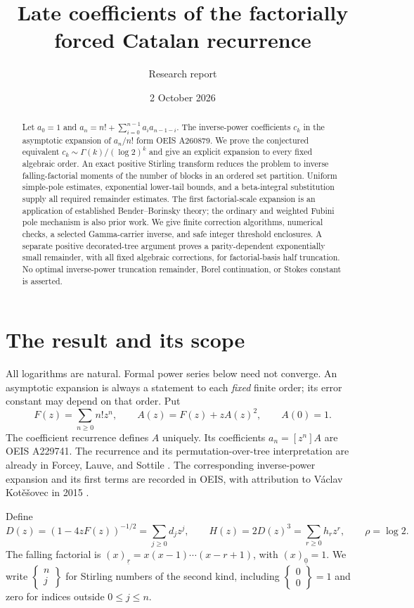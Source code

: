 \documentclass[11pt,letterpaper]{article}
\title{Late coefficients of the factorially forced Catalan recurrence}
\author{Research report}
\date{2 October 2026}
\numberwithin{equation}{section}
\theoremstyle{remark}\newtheorem{remark}[theorem]{Remark}
\newcommand{\fall}[2]{(#1)_{\underline{#2}}}
\newcommand{\stir}[2]{\left\{\begin{smallmatrix}#1\\#2\end{smallmatrix}\right\}}
\begin{document}
\maketitle
\begin{abstract}
Let $a_0=1$ and $a_n=n!+\sum_{i=0}^{n-1}a_i a_{n-1-i}$. The inverse-power coefficients $c_k$ in the asymptotic expansion of $a_n/n!$ form OEIS A260879. We prove the conjectured equivalent $c_k\sim\Gamma(k)/(\log 2)^k$ and give an explicit expansion to every fixed algebraic order. An exact positive Stirling transform reduces the problem to inverse falling-factorial moments of the number of blocks in an ordered set partition. Uniform simple-pole estimates, exponential lower-tail bounds, and a beta-integral substitution supply all required remainder estimates. The first factorial-scale expansion is an application of established Bender--Borinsky theory; the ordinary and weighted Fubini pole mechanism is also prior work. We give finite correction algorithms, numerical checks, a selected Gamma-carrier inverse, and safe integer threshold enclosures. A separate positive decorated-tree argument proves a parity-dependent exponentially small remainder, with all fixed algebraic corrections, for factorial-basis half truncation. No optimal inverse-power truncation remainder, Borel continuation, or Stokes constant is asserted.
\end{abstract}

\section{The result and its scope}
All logarithms are natural. Formal power series below need not converge. An asymptotic expansion is always a statement to each \emph{fixed} finite order; its error constant may depend on that order. Put
\begin{equation}\label{eq:def}
 F(z)=\sum_{n\ge0}n!z^n,\qquad A(z)=F(z)+zA(z)^2,
 \qquad A(0)=1.
\end{equation}
The coefficient recurrence defines $A$ uniquely. Its coefficients $a_n=[z^n]A$ are OEIS A229741. The recurrence and its permutation-over-tree interpretation are already in Forcey, Lauve, and Sottile \cite{fls}. The corresponding inverse-power expansion and its first terms are recorded in OEIS, with attribution to V\'aclav Kot\v e\v sovec in 2015 \cite{oeis229,oeis260}.

Define
\begin{equation}\label{eq:DH}
 D(z)=(1-4zF(z))^{-1/2}=\sum_{j\ge0}d_jz^j,
 \qquad H(z)=2D(z)^3=\sum_{r\ge0}h_rz^r,
 \qquad \rho=\log2.
\end{equation}
The falling factorial is $\fall{x}{r}=x(x-1)\cdots(x-r+1)$, with $\fall{x}{0}=1$. We write $\stir{n}{j}$ for Stirling numbers of the second kind, including $\stir00=1$ and zero for indices outside $0\le j\le n$.
\end{document}
